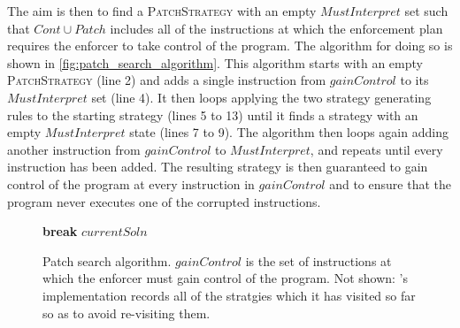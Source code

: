 The aim is then to find a \textsc{PatchStrategy} with an empty
$\mathit{MustInterpret}$ set such that $\mathit{Cont} \cup
\mathit{Patch}$ includes all of the instructions at which the
enforcement plan requires the enforcer to take control of the program.
The algorithm for doing so is shown in
\autoref{fig:patch_search_algorithm}.  This algorithm starts with an
empty \textsc{PatchStrategy} (line 2) and adds a single instruction
from $\mathit{gainControl}$ to its $\mathit{MustInterpret}$ set (line
4).  It then loops applying the two strategy generating rules to the
starting strategy (lines 5 to 13) until it finds a strategy with an
empty $\mathit{MustInterpret}$ state (lines 7 to 9).  The algorithm
then loops again adding another instruction from
$\mathit{gainControl}$ to $\mathit{MustInterpret}$, and repeats until
every instruction has been added.  The resulting strategy is then
guaranteed to gain control of the program at every instruction in
$\mathit{gainControl}$ and to ensure that the program never executes
one of the corrupted instructions.

\begin{figure}
  \begin{algorithmic}[1]
      \While {\true}
          \State \textbf{break}
        \Else
        \EndIf
      \EndWhile
    \EndFor
    \State \Return $\mathit{currentSoln}$
    \EndProcedure
  \end{algorithmic}
  \caption{Patch search algorithm.  $\mathit{gainControl}$ is the set
    of instructions at which the enforcer must gain control of the
    program.  Not shown: {\implementation}'s implementation records
    all of the stratgies which it has visited so far so as to avoid
    re-visiting them.}
  \label{fig:patch_search_algorithm}
\end{figure}


